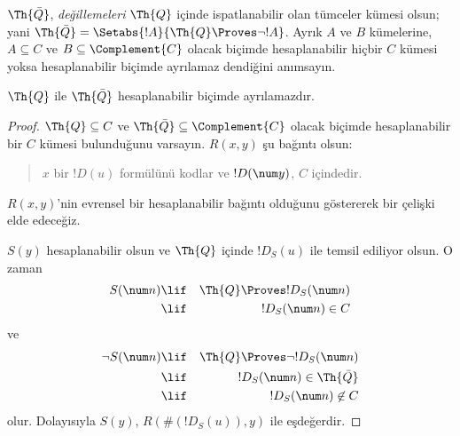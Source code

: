 \documentclass[../../../include/open-logic-section]{subfiles}
\begin{document}



$\Th{\bar Q}$, {\em değillemeleri} $\Th{Q}$ içinde ispatlanabilir olan
tümceler kümesi olsun; yani
$\Th{\bar Q} = \Setabs{!A}{\Th{Q} \Proves \lnot !A}$. Ayrık $A$ ve $B$
kümelerine, $A \subseteq C$ ve $B \subseteq \Complement{C}$ olacak biçimde
hesaplanabilir hiçbir $C$ kümesi yoksa hesaplanabilir biçimde ayrılamaz
dendiğini anımsayın.

\begin{lem}
$\Th{Q}$ ile $\Th{\bar Q}$ hesaplanabilir biçimde ayrılamazdır.
\end{lem}

\begin{proof}
$\Th{Q} \subseteq C$ ve $\Th{\bar Q} \subseteq \Complement{C}$ olacak
biçimde hesaplanabilir bir $C$ kümesi bulunduğunu varsayın. $R(x,y)$ şu
bağıntı olsun:
\begin{quote}
$x$ bir $!D(u)$ formülünü kodlar ve $!D(\num y)$, $C$ içindedir.
\end{quote}
$R(x,y)$'nin evrensel bir hesaplanabilir bağıntı olduğunu göstererek bir
çelişki elde edeceğiz.

$S(y)$ hesaplanabilir olsun ve $\Th{Q}$ içinde $!D_S(u)$ ile temsil ediliyor
olsun. O zaman
\begin{eqnarray*}
S(\num n) & \lif & \Th{Q} \Proves !D_S(\num n) \\
& \lif & !D_S(\num n) \in C
\end{eqnarray*}
ve
\begin{eqnarray*}
\lnot S(\num n) & \lif & \Th{Q} \Proves \lnot !D_S(\num n) \\
& \lif & !D_S(\num n) \in \Th{\bar Q} \\
& \lif & !D_S(\num n) \not\in C
\end{eqnarray*}
olur. Dolayısıyla $S(y)$, $R(\#(!D_S(u)),y)$ ile eşdeğerdir.
\end{proof}
\end{document}
